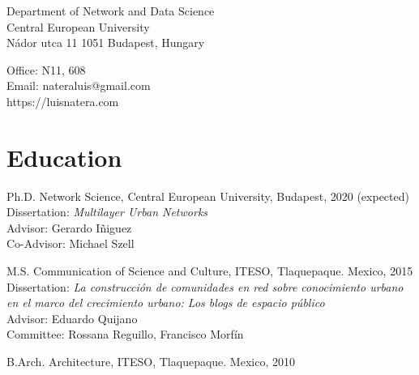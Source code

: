 \documentclass{academiccv}
\begin{document}
\raggedright

\namefont{\myname}

\vspace{1em}
\begin{minipage}[t]{0.495\textwidth}
  Department of Network and Data Science \\
  Central European University \\
  Nádor utca 11
  1051 Budapest, Hungary
\end{minipage}
\begin{minipage}[t]{0.495\textwidth}
  Office: N11, 608 \\
  Email: nateraluis@gmail.com \\
  https://luisnatera.com \\
\end{minipage}
\vspace{0.5em}



\section*{Education}

\begin{tablist}

\item[Ph.D. ] \tab Network Science, Central European University, Budapest, 2020 (expected) \\
                  Dissertation: \textit{Multilayer Urban Networks} \\
                  Advisor: Gerardo Iñiguez \\
                  Co-Advisor: Michael Szell

\item[M.S.]  \tab Communication of Science and Culture, ITESO, Tlaquepaque. Mexico, 2015 \\
					Dissertation: \textit{La construcción de comunidades en red sobre conocimiento urbano en el marco del crecimiento urbano: Los blogs de espacio público}\\
					Advisor: Eduardo Quijano \\
					Committee: Rossana Reguillo, Francisco Morfín

\item[B.Arch.]  \tab Architecture,  ITESO, Tlaquepaque. Mexico, 2010

\end{tablist}
\end{document}
